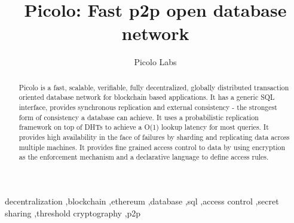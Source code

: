 \documentclass[preprint,10pt]{elsarticle}
\begin{document}
\begin{frontmatter}


\title{Picolo: Fast p2p open database network}

\author{Picolo Labs}
\address{San Francisco, California}




\begin{abstract}
Picolo is a fast, scalable, verifiable, fully decentralized, globally distributed transaction oriented database network for
blockchain based applications.  It has a generic SQL interface, provides synchronous replication and external consistency - the strongest form of consistency a database can achieve. It uses a probabilistic replication framework on top of DHTs to achieve a O(1) lookup latency for most queries. It provides high availability in the face of failures by sharding and replicating data across multiple machines. It provides fine grained access control to data by using encryption as the enforcement mechanism and a declarative language to define access rules. 
\end{abstract}

\begin{keyword}
	decentralization \sep blockchain \sep ethereum \sep database \sep sql \sep access control \sep secret sharing \sep threshold cryptography \sep p2p
\end{keyword}

\end{frontmatter}
\end{document}
